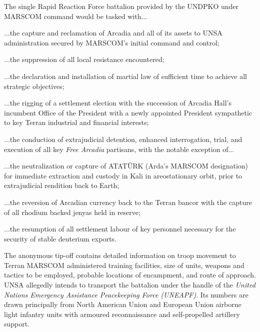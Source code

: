 The single Rapid Reaction Force battalion provided by the UNDPKO under MARSCOM command would be tasked with...

\startitemize[5]
\item ...the capture and reclamation of Arcadia and all of its assets to UNSA administration secured by MARSCOM's initial command and control;

\item ...the suppression of all local resistance encountered;

\item ...the declaration and installation of martial law of sufficient time to achieve all strategic objectives;

\item ...the rigging of a settlement election with the succession of Arcadia Hall's incumbent Office of the President with a newly appointed President sympathetic to key Terran industrial and financial interests; 

\item ...the conduction of extrajudicial detention, enhanced interrogation, trial, and execution of all key {\it Free Arcadia} partisans, with the notable exception of...

\item ...the neutralization or capture of ATATÜRK (Arda's MARSCOM designation) for immediate extraction and custody in Kali in areostationary orbit, prior to extrajudicial rendition back to Earth;

\item ...the reversion of Arcadian currency back to the Terran bancor with the capture of all rhodium backed jenyas held in reserve;

\item ...the resumption of all settlement labour of key personnel necessary for the security of stable deuterium exports.
\stopitemize

The anonymous tip-off contains detailed information on troop movement to Terran MARSCOM administered training facilities, size of units, weapons and tactics to be employed, probable locations of encampment, and route of approach. UNSA allegedly intends to transport the battalion under the handle of the {\it United Nations Emergency Assistance Peacekeeping Force (UNEAPF)}. Its numbers are drawn principally from North American Union and European Union airborne light infantry units with armoured reconnaissance and self-propelled artillery support.

